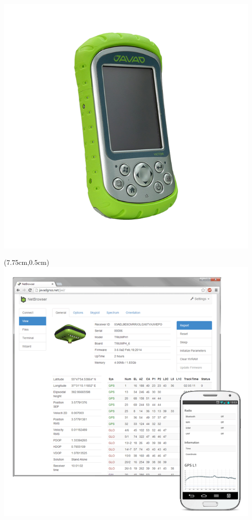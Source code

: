 \documentclass[xetex,t]{beamer}
\begin{document}
\begin{frame}
\begin{textblock*}{3cm}
    \includegraphics[width=\textwidth]{../img/javad-victor}
  \end{textblock*}
  \begin{textblock*}{3.5cm}(7.75cm,0.5cm)
    \includegraphics[width=\textwidth]{../img/javad-netbrowser}

\end{textblock*}
\end{frame}
\end{document}
